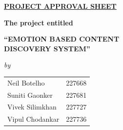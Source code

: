 \begin{center}
%
\underline{\bfseries \huge PROJECT APPROVAL SHEET}\\
\vspace{0.4cm}
\begin{figure}[H]
{\centering {}\par}
\end{figure}
\vspace{-0.6cm}
{\bfseries The project entitled}\\
\vspace{0.2cm}
\begin{large}
{\bfseries ``EMOTION BASED CONTENT\\ DISCOVERY SYSTEM''}\\
\end{large}
\vspace{0.1cm}
\begin{small}
\emph{by}\\
\end{small}
\vspace{0.1cm}
\begin{table}[H]
\normalsize
\bfseries
\begin{center}
\begin{tabular}{ll}
	Neil Botelho \hspace{1cm} & 227668 \\
Suniti Gaonker & 227681\\
Vivek Silimkhan & 227727\\
Vipul Chodankar & 227736\\
\end{tabular}
\end{center}
\end{table}
\vspace{0.8cm}
\end{center}

